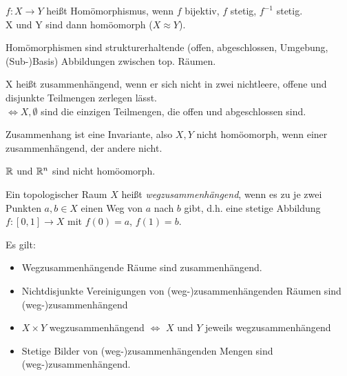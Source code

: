 \begin{defi}[Homömorphismus]
  $f:X\to Y$ heißt Homömorphismus, wenn $f$ bijektiv, $f$ stetig, $f^{-1}$ stetig.\\
  X und Y sind dann homöomorph ($X\approx Y$).
\end{defi}

\begin{bem}
  Homömorphismen sind strukturerhaltende (offen, abgeschlossen, Umgebung, (Sub-)Basis) 
  Abbildungen zwischen top. Räumen.
\end{bem}

\begin{defi}[Zusammenhang]
  X heißt zusammenhängend, wenn er sich nicht in zwei nichtleere, offene und
  disjunkte Teilmengen zerlegen lässt.\\
  $\Leftrightarrow X, \emptyset$ sind die einzigen Teilmengen, die offen und abgeschlossen sind.
\end{defi}

\begin{bem}
  Zusammenhang ist eine Invariante, also $X, Y$ nicht homöomorph, 
  wenn einer zusammenhängend, der andere nicht.
\end{bem}

\begin{bsp}
  $\mathbb R$ und $\mathbb R^n$ sind nicht homöomorph.
\end{bsp}

\begin{defi}[Wegzusammenhang]
Ein topologischer Raum $X$ heißt \emph{wegzusammenhängend}, 
wenn es zu je zwei Punkten $a, b \in X$ 
einen Weg von $a$ nach $b$ gibt, 
d.h. eine stetige Abbildung $f: [0, 1] \to X$ mit $f(0) = a$, $f(1) = b$.
\end{defi}

\begin{bem} Es gilt:
\begin{itemize}
\item Wegzusammenhängende Räume sind zusammenhängend.
\item Nichtdisjunkte Vereinigungen von (weg-)zusammenhängenden Räumen sind (weg-)zusammenhängend
\item $X \times Y$ wegzusammenhängend $\Leftrightarrow$ $X$ und $Y$ jeweils wegzusammenhängend
\item Stetige Bilder von (weg-)zusammenhängenden Mengen sind (weg-)zusammenhängend. \\
\end{itemize}
\end{bem}


